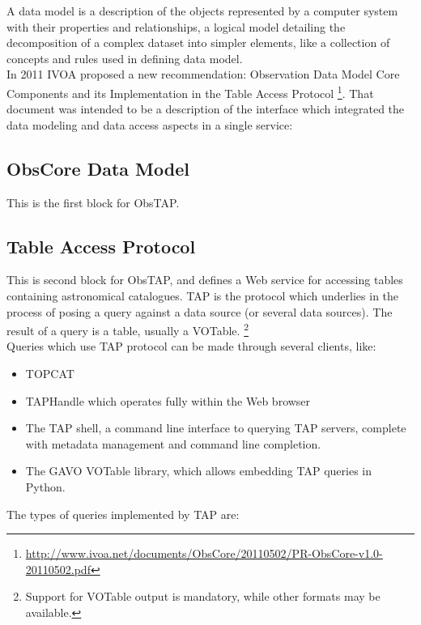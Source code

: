 A data model is a description of the objects represented by a computer system with their properties and relationships, a logical model detailing the decomposition of a complex dataset into simpler elements, like a collection of concepts and rules used in defining data model.\\

In 2011 IVOA proposed a new recommendation: Observation Data Model Core Components and its Implementation in the Table Access Protocol \footnote{\url{http://www.ivoa.net/documents/ObsCore/20110502/PR-ObsCore-v1.0-20110502.pdf}}. That document was intended to be a description of the interface which integrated the data modeling and data access aspects in a single service:\\ 


\subsection{ObsCore Data Model}

This is the first block for ObsTAP.

\subsection{Table Access Protocol}

This is second block for ObsTAP, and defines a Web service for accessing tables containing astronomical catalogues. TAP is the protocol which underlies in the process of posing a query against a data source (or several data sources). The result of a query is a table, usually a VOTable. \footnote{Support for VOTable output is mandatory, while other formats may be available.}\\ 

Queries which use TAP protocol can be made through several clients, like:
\begin{itemize}
\item TOPCAT
\item TAPHandle which operates fully within the Web browser
\item The TAP shell, a command line interface to querying TAP servers, complete with metadata management and command line completion.
\item The GAVO VOTable library, which allows embedding TAP queries in Python.
\end{itemize}

The types of queries implemented by TAP are:

